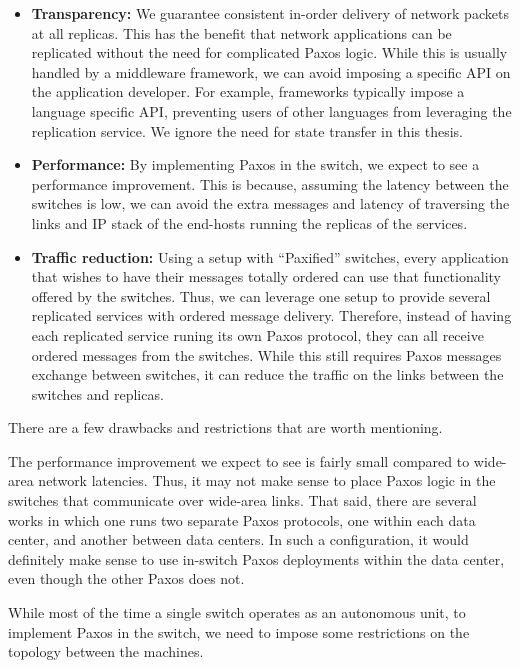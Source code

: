 \begin{itemize}
  \item \textbf{Transparency:} We guarantee consistent in-order delivery of
  network packets at all replicas.  This has the benefit that network
  applications can be replicated without the need for complicated Paxos
  logic. While this is usually handled by a middleware framework, we can
  avoid imposing a specific API on the application developer.  For example,
  frameworks typically impose a language specific API, preventing users of
  other languages from leveraging the replication service.
  We ignore the need for state transfer in this thesis.

  \item \textbf{Performance:} By implementing Paxos in the switch, we
  expect to see a performance improvement. This is because, assuming the
  latency between the switches is low, we can avoid the extra messages and
  latency of traversing the links and IP stack of the end-hosts running the
  replicas of the services.

  \item \textbf{Traffic reduction:}
  Using a setup with ``Paxified'' switches, every application that wishes to
  have their messages totally ordered can use that functionality offered by
  the switches.
  Thus, we can leverage one setup to provide several replicated
  services with ordered message delivery. Therefore, instead of having each
  replicated service runing its own Paxos protocol, they can all receive
  ordered messages from the switches. While this still requires Paxos
  messages exchange between switches, it can reduce the traffic on the
  links between the switches and replicas.

\end{itemize}

There are a few drawbacks and restrictions that are worth mentioning.

The performance improvement we expect to see is fairly small compared to
wide-area network latencies.  Thus, it may not make sense to place Paxos
logic in the switches that communicate over wide-area links. That said,
there are several works in which one runs two separate Paxos
protocols, one within each data center, and another between data
centers.
In such a configuration, it would definitely make sense to use in-switch
Paxos deployments within the data center, even though the other Paxos does
not.

While most of the time a single switch operates as an autonomous unit, to
implement Paxos in the switch, we need to impose some restrictions on the
topology between the machines.

